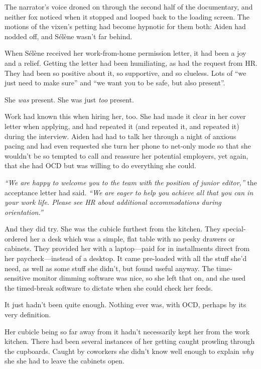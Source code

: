The narrator's voice droned on through the second half of the documentary, and neither fox noticed when it stopped and looped back to the loading screen. The motions of the vixen's petting had become hypnotic for them both: Aiden had nodded off, and Sélène wasn't far behind.

\secdiv{}

\noindent When Sélène received her work-from-home permission letter, it had been a joy and a relief. Getting the letter had been humiliating, as had the request from HR. They had been so positive about it, so supportive, and so clueless. Lots of ``we just need to make sure'' and ``we want you to be safe, but also present''.

She \emph{was} present. She was just \emph{too} present.

Work had known this when hiring her, too. She had made it clear in her cover letter when applying, and had repeated it (and repeated it, and repeated it) during the interview. Aiden had had to talk her through a night of anxious pacing and had even requested she turn her phone to net-only mode so that she wouldn't be so tempted to call and reassure her potential employers, yet again, that she had OCD but was willing to do everything she could.

\emph{``We are happy to welcome you to the team with the position of junior editor,''} the acceptance letter had said. \emph{``We are eager to help you achieve all that you can in your work life. Please see HR about additional accommodations during orientation.''}

And they did try. She was the cubicle furthest from the kitchen. They special-ordered her a desk which was a simple, flat table with no pesky drawers or cabinets. They provided her with a laptop---paid for in installments direct from her paycheck---instead of a desktop. It came pre-loaded with all the stuff she'd need, as well as some stuff she didn't, but found useful anyway. The time-sensitive monitor dimming software was nice, so she left that on, and she used the timed-break software to dictate when she could check her feeds.

It just hadn't been quite enough. Nothing ever was, with OCD, perhaps by its very definition.

Her cubicle being so far away from it hadn't necessarily kept her from the work kitchen. There had been several instances of her getting caught prowling through the cupboards. Caught by coworkers she didn't know well enough to explain \emph{why} she she had to leave the cabinets open.

